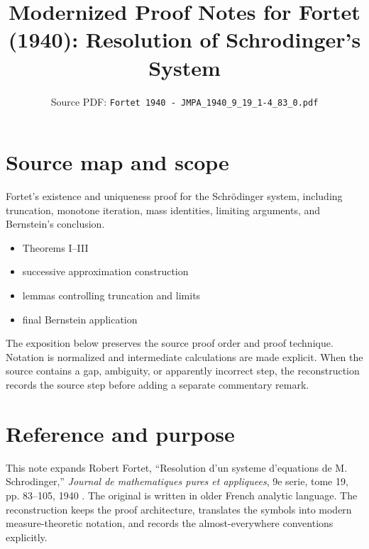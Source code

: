 
\title{Modernized Proof Notes for Fortet (1940): Resolution of Schrodinger's System}
\author{}
\date{Source PDF: \texttt{Fortet 1940 - JMPA\_1940\_9\_19\_1-4\_83\_0.pdf}}

\maketitle

\section*{Source map and scope}
\begin{description}[style=nextline,leftmargin=3.2cm,labelwidth=3cm]
\item[Primary source] \texttt{}
\item[Coverage] Fortet's existence and uniqueness proof for the Schrödinger system, including truncation, monotone iteration, mass identities, limiting arguments, and Bernstein's conclusion.
\item[Source anchors]
\begin{itemize}[leftmargin=2em]
  \item Theorems I--III
  \item successive approximation construction
  \item lemmas controlling truncation and limits
  \item final Bernstein application
\end{itemize}
\end{description}

The exposition below preserves the source proof order and proof technique.  Notation is normalized
and intermediate calculations are made explicit.  When the source contains a gap, ambiguity, or
apparently incorrect step, the reconstruction records the source step before adding a separate
commentary remark.

\section*{Reference and purpose}
This note expands Robert Fortet, ``Resolution d'un systeme d'equations de M. Schrodinger,'' \emph{Journal de mathematiques pures et appliquees}, 9e serie, tome 19, pp. 83--105, 1940 \cite{Fortet1940}.
The original is written in older French analytic language.  The reconstruction keeps the proof architecture, translates the symbols into modern measure-theoretic notation, and records the almost-everywhere conventions explicitly.

